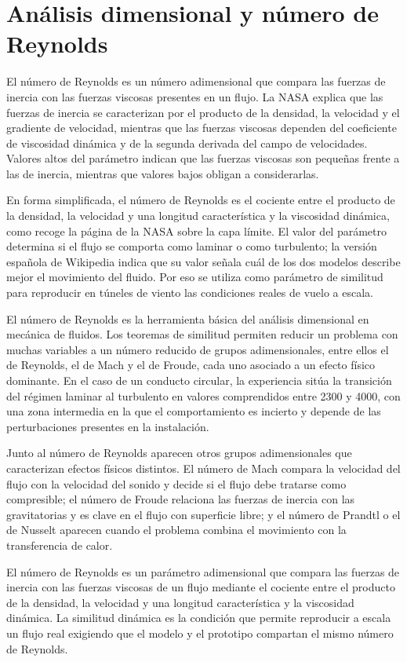\documentclass{book}
\begin{document}
\chapter{Análisis dimensional y número de Reynolds}

El número de Reynolds es un número adimensional que compara las fuerzas de inercia con las fuerzas viscosas presentes en un flujo. La NASA explica que las fuerzas de inercia se caracterizan por el producto de la densidad, la velocidad y el gradiente de velocidad, mientras que las fuerzas viscosas dependen del coeficiente de viscosidad dinámica y de la segunda derivada del campo de velocidades. Valores altos del parámetro indican que las fuerzas viscosas son pequeñas frente a las de inercia, mientras que valores bajos obligan a considerarlas.

En forma simplificada, el número de Reynolds es el cociente entre el producto de la densidad, la velocidad y una longitud característica y la viscosidad dinámica, como recoge la página de la NASA sobre la capa límite. El valor del parámetro determina si el flujo se comporta como laminar o como turbulento; la versión española de Wikipedia indica que su valor señala cuál de los dos modelos describe mejor el movimiento del fluido. Por eso se utiliza como parámetro de similitud para reproducir en túneles de viento las condiciones reales de vuelo a escala.

El número de Reynolds es la herramienta básica del análisis dimensional en mecánica de fluidos. Los teoremas de similitud permiten reducir un problema con muchas variables a un número reducido de grupos adimensionales, entre ellos el de Reynolds, el de Mach y el de Froude, cada uno asociado a un efecto físico dominante. En el caso de un conducto circular, la experiencia sitúa la transición del régimen laminar al turbulento en valores comprendidos entre 2300 y 4000, con una zona intermedia en la que el comportamiento es incierto y depende de las perturbaciones presentes en la instalación.

Junto al número de Reynolds aparecen otros grupos adimensionales que caracterizan efectos físicos distintos. El número de Mach compara la velocidad del flujo con la velocidad del sonido y decide si el flujo debe tratarse como compresible; el número de Froude relaciona las fuerzas de inercia con las gravitatorias y es clave en el flujo con superficie libre; y el número de Prandtl o el de Nusselt aparecen cuando el problema combina el movimiento con la transferencia de calor.

\begin{tcolorbox}[title={Definición}, studiumdef, breakable]

El número de Reynolds es un parámetro adimensional que compara las fuerzas de inercia con las fuerzas viscosas de un flujo mediante el cociente entre el producto de la densidad, la velocidad y una longitud característica y la viscosidad dinámica. La similitud dinámica es la condición que permite reproducir a escala un flujo real exigiendo que el modelo y el prototipo compartan el mismo número de Reynolds.
\end{tcolorbox}
\end{document}
